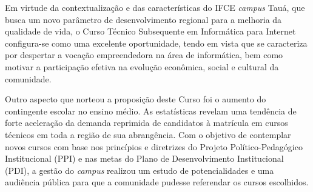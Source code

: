 \documentclass[
	12pt,				%
	openright,			%
	twoside,			%
	a4paper,			%
	chapter=TITLE,		%
	english,			%
	french,				%
	spanish,			%
	brazil,				%
	]{abntex2}
\begin{document}
Em virtude da contextualização e das características do IFCE  \textit{campus} Tauá, que busca um novo parâmetro de desenvolvimento regional para a melhoria da qualidade de vida, o Curso Técnico Subsequente em Informática para Internet  configura-se como uma excelente oportunidade, tendo em vista que se caracteriza por despertar a vocação empreendedora na área de informática, bem como motivar a participação efetiva na evolução econômica, social e cultural da comunidade.

	
Outro aspecto que norteou a proposição deste Curso foi o aumento do contingente
escolar no ensino médio. As estatísticas revelam uma tendência de forte
aceleração da demanda reprimida de candidatos à matrícula em cursos técnicos em
toda a região de sua abrangência. Com o objetivo de contemplar novos cursos com base nos princípios e diretrizes do
Projeto Político-Pedagógico Institucional (PPI) e  nas
 metas do Plano de Desenvolvimento Institucional (PDI), a gestão do  \textit{campus}
 realizou um estudo de potencialidades e uma audiência pública para que a
comunidade pudesse referendar os cursos escolhidos.







\end{document}
